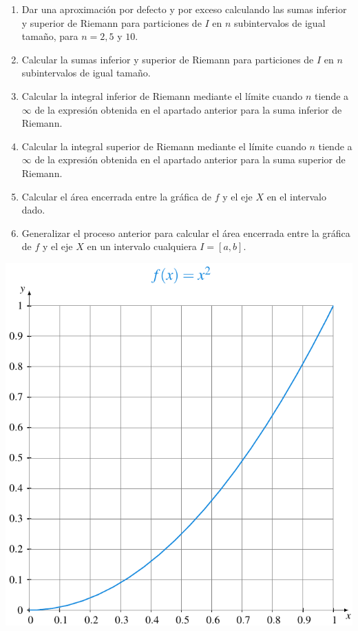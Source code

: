 \documentclass[
  a4paper,
]{scrreport}
\begin{document}
\begin{enumerate}
\def\labelenumi{\arabic{enumi}.}
\item
  Dar una aproximación por defecto y por exceso calculando las sumas
  inferior y superior de Riemann para particiones de \(I\) en \(n\)
  subintervalos de igual tamaño, para \(n=2, 5\) y \(10\).
\item
  Calcular la sumas inferior y superior de Riemann para particiones de
  \(I\) en \(n\) subintervalos de igual tamaño.
\item
  Calcular la integral inferior de Riemann mediante el límite cuando
  \(n\) tiende a \(\infty\) de la expresión obtenida en el apartado
  anterior para la suma inferior de Riemann.
\item
  Calcular la integral superior de Riemann mediante el límite cuando
  \(n\) tiende a \(\infty\) de la expresión obtenida en el apartado
  anterior para la suma superior de Riemann.
\item
  Calcular el área encerrada entre la gráfica de \(f\) y el eje \(X\) en
  el intervalo dado.
\item
  Generalizar el proceso anterior para calcular el área encerrada entre
  la gráfica de \(f\) y el eje \(X\) en un intervalo cualquiera
  \(I=[a,b]\).
\end{enumerate}

\includegraphics{img/sumas-riemann/parabola-figure0.pdf}
\end{document}
